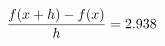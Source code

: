 \documentclass[preview]{standalone}
\begin{document}
\begin{align*}
\special{dvisvgm:raw <g id='unique000'>}\frac{f(x+h)-f(x)}{h} = 2.938\special{dvisvgm:raw </g>}
\end{align*}
\end{document}
